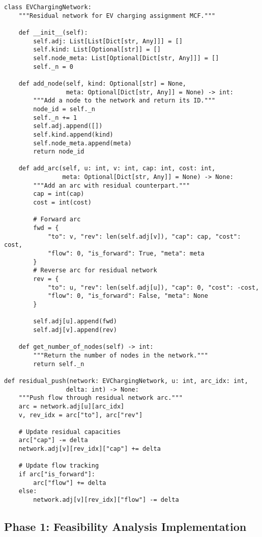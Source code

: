 \documentclass[12pt,a4paper]{article}
\begin{document}
\begin{lstlisting}[caption=Residual Network Implementation]
class EVChargingNetwork:
    """Residual network for EV charging assignment MCF."""
    
    def __init__(self):
        self.adj: List[List[Dict[str, Any]]] = []
        self.kind: List[Optional[str]] = []
        self.node_meta: List[Optional[Dict[str, Any]]] = []
        self._n = 0
    
    def add_node(self, kind: Optional[str] = None, 
                 meta: Optional[Dict[str, Any]] = None) -> int:
        """Add a node to the network and return its ID."""
        node_id = self._n
        self._n += 1
        self.adj.append([])
        self.kind.append(kind)
        self.node_meta.append(meta)
        return node_id
    
    def add_arc(self, u: int, v: int, cap: int, cost: int, 
                meta: Optional[Dict[str, Any]] = None) -> None:
        """Add an arc with residual counterpart."""
        cap = int(cap)
        cost = int(cost)
        
        # Forward arc
        fwd = {
            "to": v, "rev": len(self.adj[v]), "cap": cap, "cost": cost,
            "flow": 0, "is_forward": True, "meta": meta
        }
        # Reverse arc for residual network
        rev = {
            "to": u, "rev": len(self.adj[u]), "cap": 0, "cost": -cost,
            "flow": 0, "is_forward": False, "meta": None
        }
        
        self.adj[u].append(fwd)
        self.adj[v].append(rev)
    
    def get_number_of_nodes(self) -> int:
        """Return the number of nodes in the network."""
        return self._n

def residual_push(network: EVChargingNetwork, u: int, arc_idx: int, 
                 delta: int) -> None:
    """Push flow through residual network arc."""
    arc = network.adj[u][arc_idx]
    v, rev_idx = arc["to"], arc["rev"]
    
    # Update residual capacities
    arc["cap"] -= delta
    network.adj[v][rev_idx]["cap"] += delta
    
    # Update flow tracking
    if arc["is_forward"]:
        arc["flow"] += delta
    else:
        network.adj[v][rev_idx]["flow"] -= delta
\end{lstlisting}

\subsection{Phase 1: Feasibility Analysis Implementation}
\end{document}
